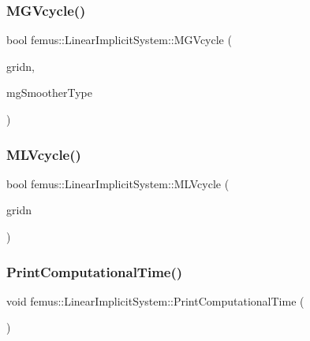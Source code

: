 \subsubsection{\texorpdfstring{M\+G\+Vcycle()}{MGVcycle()}}
{\footnotesize\ttfamily bool femus\+::\+Linear\+Implicit\+System\+::\+M\+G\+Vcycle (\begin{DoxyParamCaption}\item[{const unsigned \&}]{gridn,  }\item[{const \mbox{\hyperlink{_mg_type_enum_8hpp_aec11e12c1f11a6ad959d3280ae0ee9a8}{Mg\+Smoother\+Type}} \&}]{mg\+Smoother\+Type }\end{DoxyParamCaption})\hspace{0.3cm}{\ttfamily [protected]}}

\mbox{\label{classfemus_1_1_linear_implicit_system_a79a6c445a3e9a25e389aeb4b93f04fdc}} 
\subsubsection{\texorpdfstring{M\+L\+Vcycle()}{MLVcycle()}}
{\footnotesize\ttfamily bool femus\+::\+Linear\+Implicit\+System\+::\+M\+L\+Vcycle (\begin{DoxyParamCaption}\item[{const unsigned \&}]{gridn }\end{DoxyParamCaption})\hspace{0.3cm}{\ttfamily [protected]}}

\mbox{\label{classfemus_1_1_linear_implicit_system_acb0ea188e3201517aac9072066906dbc}} 
\subsubsection{\texorpdfstring{Print\+Computational\+Time()}{PrintComputationalTime()}}
{\footnotesize\ttfamily void femus\+::\+Linear\+Implicit\+System\+::\+Print\+Computational\+Time (\begin{DoxyParamCaption}{ }\end{DoxyParamCaption})\hspace{0.3cm}{\ttfamily [inline]}}

